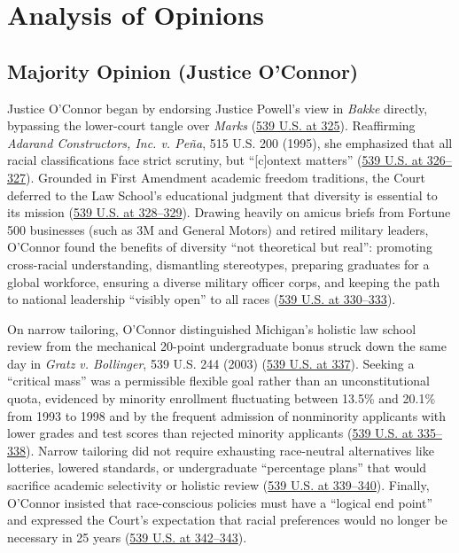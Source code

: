 \documentclass[12pt]{article}
\begin{document}
\section{Analysis of Opinions}

\subsection{Majority Opinion (Justice O'Connor)}
Justice O'Connor began by endorsing Justice Powell's view in \textit{Bakke} directly, bypassing the lower-court tangle over \textit{Marks} (\href{https://supreme.justia.com/cases/federal/us/539/306/}{539 U.S. at 325}). Reaffirming \textit{Adarand Constructors, Inc. v. Pe\~{n}a}, 515 U.S. 200 (1995), she emphasized that all racial classifications face strict scrutiny, but ``[c]ontext matters'' (\href{https://supreme.justia.com/cases/federal/us/539/306/}{539 U.S. at 326--327}). Grounded in First Amendment academic freedom traditions, the Court deferred to the Law School's educational judgment that diversity is essential to its mission (\href{https://supreme.justia.com/cases/federal/us/539/306/}{539 U.S. at 328--329}). Drawing heavily on amicus briefs from Fortune 500 businesses (such as 3M and General Motors) and retired military leaders, O'Connor found the benefits of diversity ``not theoretical but real'': promoting cross-racial understanding, dismantling stereotypes, preparing graduates for a global workforce, ensuring a diverse military officer corps, and keeping the path to national leadership ``visibly open'' to all races (\href{https://supreme.justia.com/cases/federal/us/539/306/}{539 U.S. at 330--333}).

On narrow tailoring, O'Connor distinguished Michigan's holistic law school review from the mechanical 20-point undergraduate bonus struck down the same day in \textit{Gratz v. Bollinger}, 539 U.S. 244 (2003) (\href{https://supreme.justia.com/cases/federal/us/539/306/}{539 U.S. at 337}). Seeking a ``critical mass'' was a permissible flexible goal rather than an unconstitutional quota, evidenced by minority enrollment fluctuating between 13.5\% and 20.1\% from 1993 to 1998 and by the frequent admission of nonminority applicants with lower grades and test scores than rejected minority applicants (\href{https://supreme.justia.com/cases/federal/us/539/306/}{539 U.S. at 335--338}). Narrow tailoring did not require exhausting race-neutral alternatives like lotteries, lowered standards, or undergraduate ``percentage plans'' that would sacrifice academic selectivity or holistic review (\href{https://supreme.justia.com/cases/federal/us/539/306/}{539 U.S. at 339--340}). Finally, O'Connor insisted that race-conscious policies must have a ``logical end point'' and expressed the Court's expectation that racial preferences would no longer be necessary in 25 years (\href{https://supreme.justia.com/cases/federal/us/539/306/}{539 U.S. at 342--343}).
\end{document}
